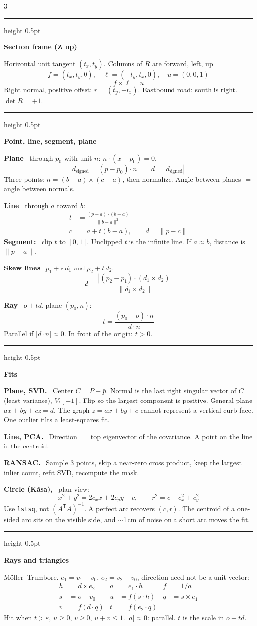 \documentclass[8pt]{extarticle}
\newcommand{\sect}[1]{%
  \par\vspace{1.5pt}%
  {\color{navy}\hrule height 0.5pt}\par\vspace{0.7pt}%
  {\sffamily\bfseries\color{navy}#1}\par\vspace{0.2pt}%
}
\newcommand{\sub}[1]{{\sffamily\bfseries\color{navy}#1}\ }
\newcommand{\eps}{\varepsilon}
\begin{document}
\begin{multicols}{3}
\sect{Section frame (Z up)}
Horizontal unit tangent $(t_x,t_y)$. Columns of $R$ are forward, left, up:
\[
f=(t_x,t_y,0),\quad
\ell=(-t_y,t_x,0),\quad
u=(0,0,1)
\]
\[
f\times\ell=u
\]
Right normal, positive offset: $r=(t_y,-t_x)$. Eastbound road: south is right. $\det R=+1$.

\sect{Point, line, segment, plane}
\sub{Plane} through $p_0$ with unit $n$: $n\cdot(x-p_0)=0$.
\[
d_{\mathrm{signed}}=(p-p_0)\cdot n
\qquad
d=|d_{\mathrm{signed}}|
\]
Three points: $n=(b-a)\times(c-a)$, then normalize. Angle between planes $=$ angle between normals.

\sub{Line} through $a$ toward $b$:
\begin{align*}
t&=\frac{(p-a)\cdot(b-a)}{\|b-a\|^{2}}\\
c&=a+t(b-a),\qquad d=\|p-c\|
\end{align*}
\sub{Segment:} clip $t$ to $[0,1]$. Unclipped $t$ is the infinite line. If $a\approx b$, distance is $\|p-a\|$.

\sub{Skew lines} $p_1+s\,d_1$ and $p_2+t\,d_2$:
\[
d=\frac{|(p_2-p_1)\cdot(d_1\times d_2)|}{\|d_1\times d_2\|}
\]

\sub{Ray} $o+td$, plane $(p_0,n)$:
\[
t=\frac{(p_0-o)\cdot n}{d\cdot n}
\]
Parallel if $|d\cdot n|\approx 0$. In front of the origin: $t>0$.

\sect{Fits}
\sub{Plane, SVD.} Center $C=P-\bar p$. Normal is the last right singular vector of $C$ (least variance), $V_t[-1]$. Flip so the largest component is positive. General plane $ax+by+cz=d$. The graph $z=ax+by+c$ cannot represent a vertical curb face. One outlier tilts a least-squares fit.

\sub{Line, PCA.} Direction $=$ top eigenvector of the covariance. A point on the line is the centroid.

\sub{RANSAC.} Sample 3 points, skip a near-zero cross product, keep the largest inlier count, refit SVD, recompute the mask.

\sub{Circle (K\r{a}sa),} plan view:
\[
x^{2}+y^{2}=2 c_x x+2 c_y y+c,\qquad
r^{2}=c+c_x^{2}+c_y^{2}
\]
Use \texttt{lstsq}, not $(A^{\mathsf T}A)^{-1}$. A perfect arc recovers $(c,r)$. The centroid of a one-sided arc sits on the visible side, and $\sim$1\,cm of noise on a short arc moves the fit.

\sect{Rays and triangles}
M\"oller--Trumbore. $e_1=v_1-v_0$, $e_2=v_2-v_0$, direction need not be a unit vector:
\begin{align*}
h&=d\times e_2 & a&=e_1\cdot h & f&=1/a\\
s&=o-v_0 & u&=f(s\cdot h) & q&=s\times e_1\\
v&=f(d\cdot q) & t&=f(e_2\cdot q)
\end{align*}
Hit when $t>\eps$, $u\ge 0$, $v\ge 0$, $u+v\le 1$. $|a|\approx 0$: parallel. $t$ is the scale in $o+td$.


\end{multicols}
\end{document}
